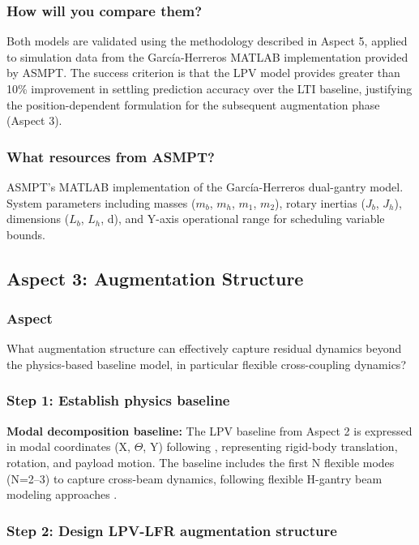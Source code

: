 \subsubsection{How will you compare them?}

Both models are validated using the methodology described in Aspect 5, applied to simulation data from the García-Herreros MATLAB implementation provided by ASMPT. The success criterion is that the LPV model provides greater than 10\% improvement in settling prediction accuracy over the LTI baseline, justifying the position-dependent formulation for the subsequent augmentation phase (Aspect 3).

\subsubsection{What resources from ASMPT?}

ASMPT's MATLAB implementation of the García-Herreros dual-gantry model. System parameters including masses ($m_b$, $m_h$, $m_1$, $m_2$), rotary inertias ($J_b$, $J_h$), dimensions ($L_b$, $L_h$, d), and Y-axis operational range for scheduling variable bounds.

\subsection{Aspect 3: Augmentation Structure}

\subsubsection*{Aspect}
What augmentation structure can effectively capture residual dynamics beyond the physics-based baseline model, in particular flexible cross-coupling dynamics?

\subsubsection{Step 1: Establish physics baseline}

\textbf{Modal decomposition baseline:}
The LPV baseline from Aspect 2 is expressed in modal coordinates (X, $\Theta$, Y) following \citet{garcia2013model}, representing rigid-body translation, rotation, and payload motion. The baseline includes the first N flexible modes (N=2--3) to capture cross-beam dynamics, following flexible H-gantry beam modeling approaches \citep{chen2019modeling}.

\subsubsection{Step 2: Design LPV-LFR augmentation structure}

